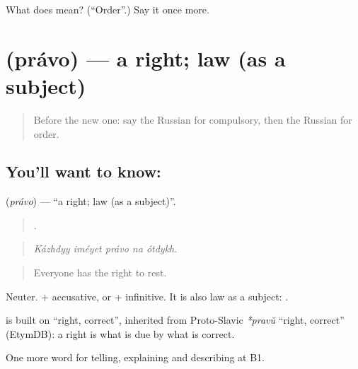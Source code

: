 \begin{tcolorbox}[breakable,colback=teal!4,colframe=teal!35!black,title={Before you move on}]
What does  mean? (\textquotedblleft{}Order\textquotedblright{}.) Say it once more.
\end{tcolorbox}
\section[\texorpdfstring{\ru{право} (právo)}{право (právo)}]{ (právo) — a right; law (as a subject)}

\label{lesson:RU-C390-pravo}



\begin{quote}
Before the new one: say the Russian for compulsory, then the Russian for order.
\end{quote}

\subsection*{You'll want to know: }
\textbf{} (\emph{právo}) — \textquotedblleft{}a right; law (as a subject)\textquotedblright{}.

\begin{quote}
    .
\end{quote}

\begin{quote}
\emph{Kázhdyy iméyet právo na ótdykh.}
\end{quote}

\begin{quote}
Everyone has the right to rest.
\end{quote}

Neuter. \emph{  } + accusative, or + infinitive. It is also law as a subject: \emph{ }.

\begin{cousinweb}
\textbf{} is built on \emph{} \textquotedblleft{}right, correct\textquotedblright{}, inherited from Proto-Slavic \emph{*pravŭ} \textquotedblleft{}right, correct\textquotedblright{} (EtymDB): a right is what is due by what is correct.
\end{cousinweb}

\begin{grammarlens}[title={What you've built}]
One more word for telling, explaining and describing at B1.
\end{grammarlens}

